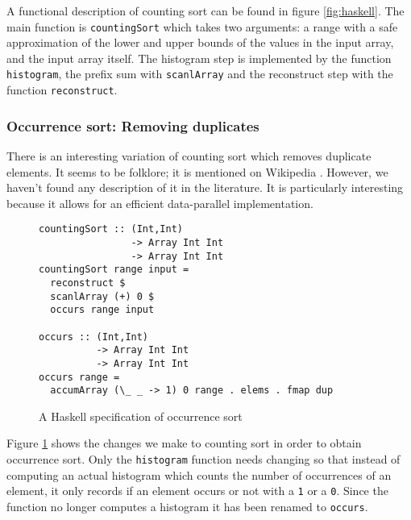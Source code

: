 A functional description of counting sort can be found in figure
\ref{fig:haskell}. The main function is \verb!countingSort! which
takes two arguments: a range with a safe approximation of the lower
and upper bounds of the values in the input array, and the input array
itself. The histogram step is implemented by the function
\verb!histogram!, the prefix sum with \verb!scanlArray! and the
reconstruct step with the function \verb!reconstruct!.

\subsubsection{Occurrence sort: Removing duplicates}

There is an interesting variation of counting sort which removes
duplicate elements. It seems to be folklore; it is mentioned on
Wikipedia \cite{wikipedia}. However, we haven't found any description
of it in the literature. It is particularly interesting because it
allows for an efficient data-parallel implementation.


\begin{figure}
\begin{small}
\begin{verbatim}
countingSort :: (Int,Int) 
                -> Array Int Int 
                -> Array Int Int
countingSort range input =
  reconstruct $
  scanlArray (+) 0 $
  occurs range input

occurs :: (Int,Int) 
          -> Array Int Int 
          -> Array Int Int
occurs range = 
  accumArray (\_ _ -> 1) 0 range . elems . fmap dup
\end{verbatim}
\end{small}
\caption{A Haskell specification of occurrence sort}
\label{fig:duphaskell}
\end{figure}

Figure \ref{fig:duphaskell} shows the changes we make 
to counting sort in order to obtain occurrence sort.
Only the \verb!histogram! function needs changing
so that instead of computing an actual histogram which counts the
number of occurrences of an element, it only records if an element
occurs or not with a \verb!1! or a \verb!0!. Since the function
no longer computes a histogram it has been renamed to
\verb!occurs!.

